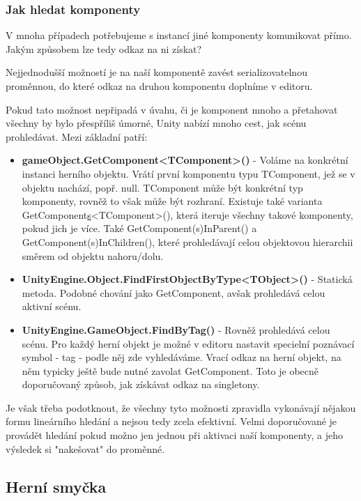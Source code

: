 \subsubsection*{Jak hledat komponenty}

V mnoha případech potřebujeme s instancí jiné komponenty komunikovat přímo. Jakým způsobem lze tedy odkaz na ni získat?

Nejjednodušší možností je na naší komponentě zavést serializovatelnou proměnnou, do které odkaz na druhou komponentu doplníme v editoru. 

Pokud tato možnost nepřipadá v úvahu, či je komponent mnoho a přetahovat všechny by bylo přespříliš úmorné, Unity nabízí mnoho cest, jak scénu prohledávat. Mezi základní patří:

\begin{itemize}
    \item \textbf{gameObject.GetComponent<TComponent>()} - Voláme na konkrétní instanci herního objektu. Vrátí první komponentu typu TComponent, jež se v objektu nachází, popř. null. TComponent může být konkrétní typ komponenty, rovněž to však může být rozhraní. Existuje také varianta GetComponent\underline{s}<TComponent>(), která iteruje všechny takové komponenty, pokud jich je více. Také GetComponent(s)InParent() a GetComponent(s)InChildren(), které prohledávají celou objektovou hierarchii směrem od objektu nahoru/dolu.
    \item \textbf{UnityEngine.Object.FindFirstObjectByType<TObject>()} - Statická metoda. Podobné chování jako GetComponent, avšak prohledává celou aktivní scénu. 
    \item \textbf{UnityEngine.GameObject.FindByTag()} - Rovněž prohledává celou scénu. Pro každý herní objekt je možné v editoru nastavit specielní poznávací symbol - tag - podle něj zde vyhledáváme. Vrací odkaz na herní objekt, na něm typicky ještě bude nutné zavolat GetComponent. Toto je obecně doporučovaný způsob, jak získávat odkaz na singletony.
\end{itemize}

Je však třeba podotknout, že všechny tyto možnosti zpravidla vykonávají nějakou formu lineárního hledání a nejsou tedy zcela efektivní. Velmi doporučované je provádět hledání pokud možno jen jednou při aktivaci naší komponenty, a jeho výsledek si "nakešovat" do proměnné.

\subsection{Herní smyčka}

